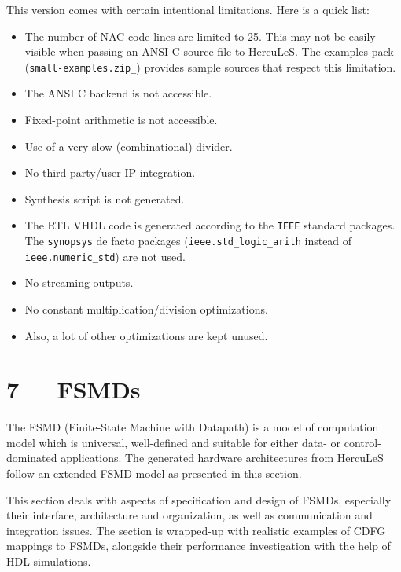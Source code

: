\documentclass[a4paper]{article}
\begin{document}
This version comes with certain intentional limitations. Here is a quick list:
%
\begin{itemize}

\item The number of NAC code lines are limited to 25. This may not be easily
visible when passing an ANSI C source file to HercuLeS. The examples pack
(\texttt{small-examples.zip\_}) provides sample sources that respect this limitation.

\item The ANSI C backend is not accessible.

\item Fixed-point arithmetic is not accessible.

\item Use of a very slow (combinational) divider.

\item No third-party/user IP integration.

\item Synthesis script is not generated.

\item The RTL VHDL code is generated according to the \texttt{IEEE} standard packages.
The \texttt{synopsys} de facto packages (\texttt{ieee.std\_logic\_arith} instead of
\texttt{ieee.numeric\_std}) are not used.

\item No streaming outputs.

\item No constant multiplication/division optimizations.

\item Also, a lot of other optimizations are kept unused.

\end{itemize}


\section{7~~~FSMDs%
  \label{fsmds}%
}

The FSMD (Finite-State Machine with Datapath) is a model of computation model
which is universal, well-defined and suitable for either data- or control-
dominated applications. The generated hardware architectures from HercuLeS follow
an extended FSMD model as presented in this section.

This section deals with aspects of specification and design of FSMDs, especially
their interface, architecture and organization, as well as communication and
integration issues. The section is wrapped-up with realistic examples of CDFG
mappings to FSMDs, alongside their performance investigation with the help of HDL
simulations.
\end{document}
